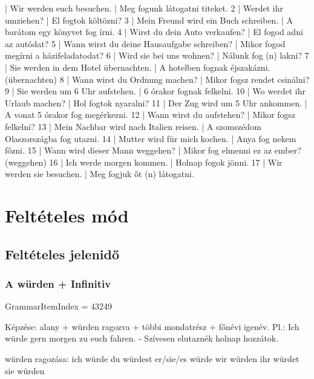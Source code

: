 \documentclass{article}
\newenvironment{desc}{\verbatim}{\endverbatim}
\newenvironment{exmp}{\verbatim}{\endverbatim}
\begin{document}
\begin{exmp}
1 | Wir werden euch besuchen. | Meg fogunk látogatni titeket.
2 | Werdet ihr umziehen? | El fogtok költözni?
3 | Mein Freund wird ein Buch schreiben. | A barátom egy könyvet fog írni.
4 | Wirst du dein Auto verkaufen? | El fogod adni az autódat?
5 | Wann wirst du deine Hausaufgabe schreiben? | Mikor fogod megírni a házifeladatodat?
6 | Wird sie bei uns wohnen? | Nálunk fog (n) lakni?
7 | Sie werden in dem Hotel übernachten. | A hotelben fognak éjszakázni. (übernachten)
8 | Wann wirst du Ordnung machen? | Mikor fogsz rendet csinálni?
9 | Sie werden um 6 Uhr aufstehen. | 6 órakor fognak felkelni.
10 | Wo werdet ihr Urlaub machen? | Hol fogtok nyaralni?
11 | Der Zug wird um 5 Uhr ankommen. | A vonat 5 órakor fog megérkezni.
12 | Wann wirst du aufstehen? | Mikor fogsz felkelni?
13 | Mein Nachbar wird nach Italien reisen. | A szomszédom Olaszországba fog utazni.
14 | Mutter wird für mich kochen. | Anya fog nekem főzni.
15 | Wann wird dieser Mann weggehen? | Mikor fog elmenni ez az ember? (weggehen)
16 | Ich werde morgen kommen. | Holnap fogok jönni.
17 | Wir werden sie besuchen. | Meg fogjuk őt (n) látogatni.
\end{exmp}

\section{Feltételes mód}

\subsection{Feltételes jelenidő}

\subsubsection{A würden + Infinitiv}

GrammarItemIndex = 43249

\begin{desc}
Képzése: alany + würden ragozva + többi mondatrész + főnévi igenév.
Pl.: Ich würde gern morgen zu euch fahren. - Szívesen elutaznék holnap hozzátok.

würden ragozása:
ich würde
du würdest
er/sie/es würde
wir würden
ihr würdet
sie würden
\end{desc}
\end{document}
